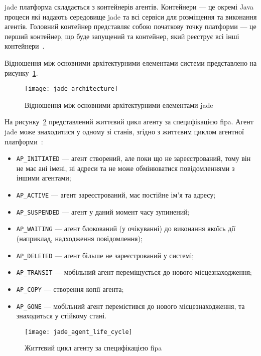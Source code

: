 \acrshort{jade} платформа складається з контейнерів агентів. 
Контейнери --- це окремі Java процеси які надають середовище \acrshort{jade} та всі сервіси для розміщення та виконання агентів. 
Головний контейнер представляє собою початкову точку платформи --- це перший контейнер, що буде запущений та контейнер, який реєструє всі інші контейнери~\cite{Bellifemine2007}.

Відношення між основними архітектурними елементами системи представлено на рисунку~\ref{fig:jade_architecture}.

\begin{figure}[H]
	\centering
	\texttt{[image: jade\_architecture]}
	\caption{Відношення між основними архітектурними елементами \acrshort{jade}~\cite{Bellifemine2007}}
	\label{fig:jade_architecture}
\end{figure}

На рисунку~\ref{fig:jade_agent_life_cycle} представлений життєвий цикл агенту за специфікацією \acrshort{fipa}. Агент \acrshort{jade} може знаходитися у одному зі станів, згідно з життєвим циклом агентної платформи~\cite{fipa}:
\begin{itemize}
	\item \texttt{AP\_INITIATED} --- агент створений, але поки що не зареєстрований, тому він не має ані імені, ні адреси та не може обмінюватися повідомленнями з іншими агентами; 
	\item \texttt{AP\_ACTIVE} --- агент зареєстрований, має постійне ім'я та адресу;
	\item \texttt{AP\_SUSPENDED} --- агент у даний момент часу зупинений;
	\item \texttt{AP\_WAITING} --- агент блокований (у очікуванні) до виконання якоїсь дії (наприклад, надходження повідомлення);
	\item \texttt{AP\_DELETED} --- агент більше не зареєстрований у системі;
	\item \texttt{AP\_TRANSIT} --- мобільний агент переміщується до нового місцезнаходження; 
	\item \texttt{AP\_COPY} --- створення копії агента; 
	\item \texttt{AP\_GONE} --- мобільний агент перемістився до нового місцезнаходження, та знаходиться у стійкому стані.
\end{itemize}

\begin{figure}[H]
	\centering
	\texttt{[image: jade\_agent\_life\_cycle]}
	\caption{Життєвий цикл агенту за специфікацією \acrshort{fipa}~\cite{fipa}}
	\label{fig:jade_agent_life_cycle}
\end{figure}

